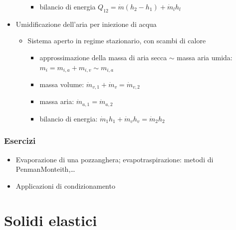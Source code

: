 \documentclass[letterpaper,10pt,italian]{jupyterBook}
\begin{document}
\begin{itemize}
\begin{itemize}
\begin{itemize}
\item {} 
\sphinxAtStartPar
bilancio di energia \(Q_{12} = \dot{m}(h_2 - h_1) + \dot{m}_l h_l\)

\end{itemize}

\end{itemize}

\item {} 
\sphinxAtStartPar
Umidificazione dell’aria per iniezione di acqua
\begin{itemize}
\item {} 
\sphinxAtStartPar
Sistema aperto in regime stazionario, con scambi di calore
\begin{itemize}
\item {} 
\sphinxAtStartPar
approssimazione della massa di aria secca \(\sim\) massa aria umida: \(m_{i} = m_{i,a} + m_{i,v} \sim m_{i,a}\)

\item {} 
\sphinxAtStartPar
massa volume: \(\dot{m}_{v,1} + \dot{m}_v = \dot{m}_{v,2}\)

\item {} 
\sphinxAtStartPar
massa aria: \(\dot{m}_{a,1} = \dot{m}_{a,2}\)

\item {} 
\sphinxAtStartPar
bilancio di energia: \(\dot{m}_{1} h_1 + \dot{m}_v h_v = \dot{m}_2 h_2\)

\end{itemize}

\end{itemize}

\end{itemize}


\subsubsection{Esercizi}
\label{\detokenize{ch/thermodynamics/humid-air:esercizi}}\begin{itemize}
\item {} 
\sphinxAtStartPar
Evaporazione di una pozzanghera; evapo\sphinxhyphen{}traspirazione: metodi di Penman\sphinxhyphen{}Monteith,…

\item {} 
\sphinxAtStartPar
Applicazioni di condizionamento

\end{itemize}

\sphinxstepscope


\section{Solidi elastici}
\label{\detokenize{ch/thermodynamics/elastic-solid-1d:solidi-elastici}}\label{\detokenize{ch/thermodynamics/elastic-solid-1d:physics-hs-thermodynamics-matter-elastic-1d}}\label{\detokenize{ch/thermodynamics/elastic-solid-1d::doc}}
\end{document}
